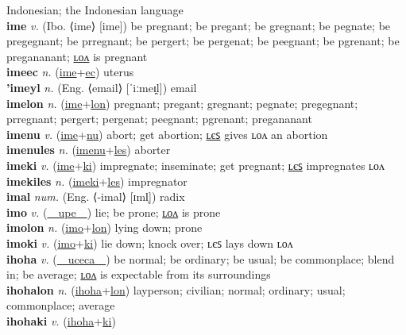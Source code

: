 Indonesian; the Indonesian language \label{'intonesiatilip} \\
\textbf{ime} \textit{v.} (Ibo. ⟨ime⟩ [ime])
be pregnant; be pregant; be gregnant; be pegnate; be pregegnant; be prregnant; be pergert; be pergenat; be peegnant; be pgrenant; be pregananant; \hyperref[imelon]{ʟᴏᴧ} is pregnant \label{ime} \\
\textbf{imeec} \textit{n.} (\hyperref[ime]{ime}+\hyperref[ec]{ec})
uterus \label{imeec} \\
\textbf{'imeyl} \textit{n.} (Eng. ⟨email⟩ [ˈiːmeɪ̯l])
email \label{'imeyl} \\
\textbf{imelon} \textit{n.} (\hyperref[ime]{ime}+\hyperref[lon]{lon})
pregnant; pregant; gregnant; pegnate; pregegnant; prregnant; pergert; pergenat; peegnant; pgrenant; pregananant \label{imelon} \\
\textbf{imenu} \textit{v.} (\hyperref[ime]{ime}+\hyperref[nu]{nu})
abort; get abortion; \hyperref[imenules]{ʟєꜱ} gives ʟᴏᴧ an abortion \label{imenu} \\
\textbf{imenules} \textit{n.} (\hyperref[imenu]{imenu}+\hyperref[les]{les})
aborter \label{imenules} \\
\textbf{imeki} \textit{v.} (\hyperref[ime]{ime}+\hyperref[ki]{ki})
impregnate; inseminate; get pregnant; \hyperref[imekiles]{ʟєꜱ} impregnates ʟᴏᴧ \label{imeki} \\
\textbf{imekiles} \textit{n.} (\hyperref[imeki]{imeki}+\hyperref[les]{les})
impregnator \label{imekiles} \\
\textbf{imal} \textit{num.} (Eng. ⟨-imal⟩ [ɪml̩])
radix \label{imal} \\
\textbf{imo} \textit{v.} (\hyperref[upe]{~~upe~~})
lie; be prone; \hyperref[imolon]{ʟᴏᴧ} is prone \label{imo} \\
\textbf{imolon} \textit{n.} (\hyperref[imo]{imo}+\hyperref[lon]{lon})
lying down; prone \label{imolon} \\
\textbf{imoki} \textit{v.} (\hyperref[imo]{imo}+\hyperref[ki]{ki})
lie down; knock over; ʟєꜱ lays down ʟᴏᴧ \label{imoki} \\
\textbf{ihoha} \textit{v.} (\hyperref[uceca]{~~uceca~~})
be normal; be ordinary; be usual; be commonplace; blend in; be average; \hyperref[ihohalon]{ʟᴏᴧ} is expectable from its surroundings \label{ihoha} \\
\textbf{ihohalon} \textit{n.} (\hyperref[ihoha]{ihoha}+\hyperref[lon]{lon})
layperson; civilian; normal; ordinary; usual; commonplace; average \label{ihohalon} \\
\textbf{ihohaki} \textit{v.} (\hyperref[ihoha]{ihoha}+\hyperref[ki]{ki})
